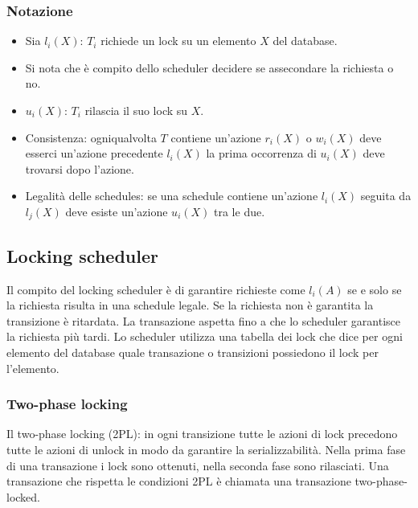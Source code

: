 \subsubsection{Notazione}
\begin{itemize}
\item Sia $l_i(X)$: $T_i$ richiede un lock su un elemento $X$ del database. 
\item Si nota che \`e compito dello scheduler decidere se assecondare la richiesta o no.
\item $u_i(X)$: $T_i$ rilascia il suo lock su $X$. 
\item Consistenza: ogniqualvolta $T$ contiene un'azione $r_i(X)$ o $w_i(X)$ deve esserci un'azione precedente $l_i(X)$ la prima occorrenza di  $u_i(X)$ deve trovarsi dopo l'azione.
\item Legalit\`a delle schedules: se una schedule contiene un'azione $l_i(X)$ seguita da $l_j(X)$ deve esiste un'azione $u_i(X)$ tra le due.   
\end{itemize}
\subsection{Locking scheduler}
Il compito del locking scheduler \`e di garantire richieste come $l_i(A)$ se e solo se la richiesta risulta in una schedule legale. Se la richiesta non \`e garantita la transizione \`e ritardata. La transazione aspetta 
fino a che lo scheduler garantisce la richiesta pi\`u tardi. Lo scheduler utilizza una tabella dei lock che dice per ogni elemento del database quale transazione o transizioni possiedono il lock per l'elemento.
\subsubsection{Two-phase locking}
Il two-phase locking (2PL): in ogni transizione tutte le azioni di lock precedono tutte le azioni di unlock in modo da garantire la serializzabilit\`a. Nella prima fase di una transazione i lock sono ottenuti, nella 
seconda fase sono rilasciati. Una transazione che rispetta le condizioni 2PL \`e chiamata una transazione two-phase-locked. 
